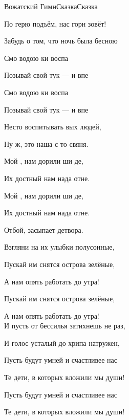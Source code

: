 \documentclass[11pt,a5paper]{book}
\begin{document}
\begin{song}{Вожатский Гимн}{}{Сказка}{Сказка}{}{}

	По герю подъём, нас горн зовёт!\par
	Забудь о том, что ночь была бесною\par
    Смо водою ки воспа\par    
    Позывай свой тук — и впе\par
    Смо водою ки воспа\par    
    Позывай свой тук — и впе\par
    
	\begin{SBOpGroup}
Несто воспитывать вых людей,\par
Ну  ж, это наша с то свяня.\par
Мой , нам дорили ши де,\par
Их достный  нам нада отне.\par
Мой , нам дорили ши де,\par
Их достный  нам нада отне.\par
\end{SBOpGroup}

Отбой, засыпает детвора.\par
Взгляни на их улыбки полусонные,\par
Пускай им снятся острова зелёные,\par
А нам опять работать до утра!\par
Пускай им снятся острова зелёные,\par
А нам опять работать до утра!\\

И пусть от бессилья затихнешь не раз,\par
И голос усталый до хрипа натружен,\par
Пусть будут умней и счастливее нас\par
Те дети, в которых вложили мы души!\par
Пусть будут умней и счастливее нас\par
Те дети, в которых вложили мы души!

\end{song}
\end{document}
